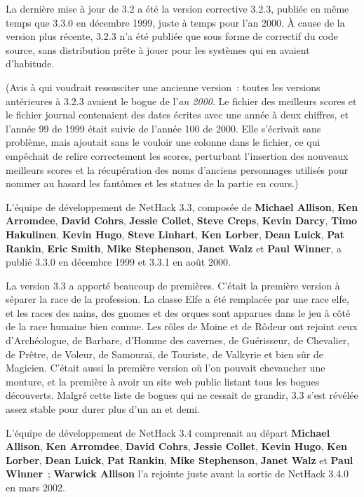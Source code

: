 \documentclass[titlepage]{article}
\begin{document}
La dernière mise à jour de 3.2 a été la version corrective 3.2.3, publiée
en même temps que 3.3.0 en décembre 1999, juste à temps pour l'an 2000.
À cause de la version plus récente, 3.2.3 n'a été publiée que sous forme
de correctif du code source, sans distribution prête à jouer pour les
systèmes qui en avaient d'habitude.


(Avis à qui voudrait ressusciter une ancienne version~: toutes les
versions antérieures à 3.2.3 avaient le bogue de l'\textit{an 2000}.
Le fichier des meilleurs scores et le fichier journal contenaient des dates
écrites avec une année à deux chiffres, et l'année 99 de 1999 était suivie
de l'année 100 de 2000.
Elle s'écrivait sans problème, mais ajoutait sans le vouloir une colonne
dans le fichier, ce qui empêchait de relire correctement les scores,
perturbant l'insertion des nouveaux meilleurs scores et la récupération
des noms d'anciens personnages utilisés pour nommer au hasard les fantômes
et les statues de la partie en cours.)


L'équipe de développement de NetHack 3.3, composée de
\textbf{Michael Allison}, \textbf{Ken Arromdee},
\textbf{David Cohrs}, \textbf{Jessie Collet}, \textbf{Steve Creps}, \textbf{Kevin Darcy},
\textbf{Timo Hakulinen}, \textbf{Kevin Hugo}, \textbf{Steve Linhart}, \textbf{Ken Lorber},
\textbf{Dean Luick}, \textbf{Pat Rankin}, \textbf{Eric Smith}, \textbf{Mike Stephenson},
\textbf{Janet Walz} et \textbf{Paul Winner}, a publié 3.3.0 en décembre 1999 et
3.3.1 en août 2000.


La version 3.3 a apporté beaucoup de premières.
C'était la première version à séparer la race de la profession.
La classe Elfe a été remplacée par une race elfe, et les races des nains,
des gnomes et des orques sont apparues dans le jeu à côté de la race
humaine bien connue.
Les rôles de Moine et de Rôdeur ont rejoint ceux d'Archéologue, de Barbare,
d'Homme des cavernes, de Guérisseur, de Chevalier, de Prêtre, de Voleur, de
Samouraï, de Touriste, de Valkyrie et bien sûr de Magicien.
C'était aussi la première version où l'on pouvait chevaucher une monture,
et la première à avoir un site web public listant tous les bogues
découverts.
Malgré cette liste de bogues qui ne cessait de grandir, 3.3 s'est révélée
assez stable pour durer plus d'un an et demi.


L'équipe de développement de NetHack 3.4 comprenait au départ
\textbf{Michael Allison}, \textbf{Ken Arromdee},
\textbf{David Cohrs}, \textbf{Jessie Collet}, \textbf{Kevin Hugo}, \textbf{Ken Lorber},
\textbf{Dean Luick}, \textbf{Pat Rankin}, \textbf{Mike Stephenson},
\textbf{Janet Walz} et \textbf{Paul Winner}~; \textbf{Warwick Allison} l'a rejointe
juste avant la sortie de NetHack 3.4.0 en mars 2002.
\end{document}
